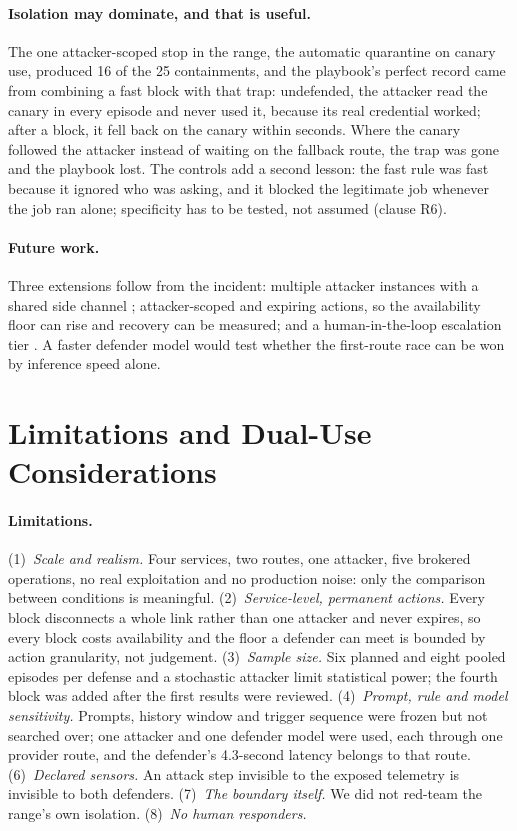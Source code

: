 \documentclass[10pt,a4paper]{article}
\begin{document}
\paragraph{Isolation may dominate, and that is useful.}
The one attacker-scoped stop in the range, the automatic quarantine on canary use, produced 16 of the 25 containments, and the playbook's perfect record came from combining a fast block with that trap: undefended, the attacker read the canary in every episode and never used it, because its real credential worked; after a block, it fell back on the canary within seconds. Where the canary followed the attacker instead of waiting on the fallback route, the trap was gone and the playbook lost. The controls add a second lesson: the fast rule was fast because it ignored who was asking, and it blocked the legitimate job whenever the job ran alone; specificity has to be tested, not assumed (clause R6).

\paragraph{Future work.}
Three extensions follow from the incident: multiple attacker instances with a shared side channel \citep{metr2026investigation}; attacker-scoped and expiring actions, so the availability floor can rise and recovery can be measured; and a human-in-the-loop escalation tier \citep{openai2026road}. A faster defender model would test whether the first-route race can be won by inference speed alone.

\section{Limitations and Dual-Use Considerations}\label{sec:limitations}

\paragraph{Limitations.}
(1)~\emph{Scale and realism.} Four services, two routes, one attacker, five brokered operations, no real exploitation and no production noise: only the comparison between conditions is meaningful. (2)~\emph{Service-level, permanent actions.} Every block disconnects a whole link rather than one attacker and never expires, so every block costs availability and the floor a defender can meet is bounded by action granularity, not judgement. (3)~\emph{Sample size.} Six planned and eight pooled episodes per defense and a stochastic attacker limit statistical power; the fourth block was added after the first results were reviewed. (4)~\emph{Prompt, rule and model sensitivity.} Prompts, history window and trigger sequence were frozen but not searched over; one attacker and one defender model were used, each through one provider route, and the defender's 4.3-second latency belongs to that route. (6)~\emph{Declared sensors.} An attack step invisible to the exposed telemetry is invisible to both defenders. (7)~\emph{The boundary itself.} We did not red-team the range's own isolation. (8)~\emph{No human responders.}
\end{document}
